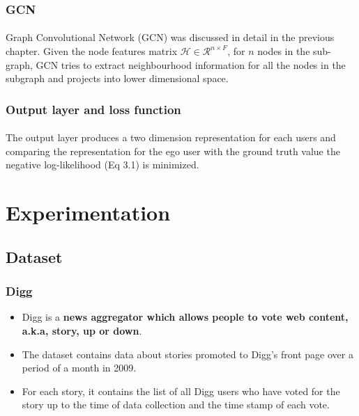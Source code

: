 \subsubsection{GCN}

\paragraph{} Graph Convolutional Network (GCN) was discussed in detail in the previous chapter. Given the node features 
matrix $\mathcal{H} \in \mathcal{R}^{n \times F}$, for $n$ nodes in the sub-graph, GCN tries to extract neighbourhood 
information for all the nodes in the subgraph and projects into lower dimensional space.

\subsubsection{Output layer and loss function}

\paragraph{} The output layer produces a two dimension representation for each users and comparing the representation for
the ego user with the ground truth value the negative log-likelihood (Eq 3.1) is minimized.

\section{Experimentation}

\subsection{Dataset}

\subsubsection{Digg}
\begin{itemize}
    \item Digg is a \textbf{news aggregator which allows people to vote web content, a.k.a, story, up or down}.
    \item The dataset contains data about stories promoted to Digg’s front page over a period of a month in 2009.
    \item For each story, it contains the list of all Digg users who have voted for the story up to the 
    time of data collection and the time stamp of each vote.
\end{itemize}

